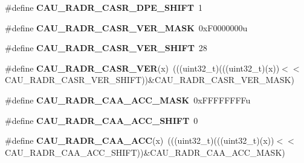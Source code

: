 \begin{DoxyCompactItemize}
\item 
\#define {\bfseries C\+A\+U\+\_\+\+R\+A\+D\+R\+\_\+\+C\+A\+S\+R\+\_\+\+D\+P\+E\+\_\+\+S\+H\+I\+FT}~1\hypertarget{group__CAU__Register__Masks_ga29f9fdde7f5d91e78a00e02dc66d90ce}{}\label{group__CAU__Register__Masks_ga29f9fdde7f5d91e78a00e02dc66d90ce}

\item 
\#define {\bfseries C\+A\+U\+\_\+\+R\+A\+D\+R\+\_\+\+C\+A\+S\+R\+\_\+\+V\+E\+R\+\_\+\+M\+A\+SK}~0x\+F0000000u\hypertarget{group__CAU__Register__Masks_ga93d73e487a9f7e0f78ff89b8c2162099}{}\label{group__CAU__Register__Masks_ga93d73e487a9f7e0f78ff89b8c2162099}

\item 
\#define {\bfseries C\+A\+U\+\_\+\+R\+A\+D\+R\+\_\+\+C\+A\+S\+R\+\_\+\+V\+E\+R\+\_\+\+S\+H\+I\+FT}~28\hypertarget{group__CAU__Register__Masks_ga9b9d89d85aab94d1cf9066dcdc9f80b3}{}\label{group__CAU__Register__Masks_ga9b9d89d85aab94d1cf9066dcdc9f80b3}

\item 
\#define {\bfseries C\+A\+U\+\_\+\+R\+A\+D\+R\+\_\+\+C\+A\+S\+R\+\_\+\+V\+ER}(x)~(((uint32\+\_\+t)(((uint32\+\_\+t)(x))$<$$<$C\+A\+U\+\_\+\+R\+A\+D\+R\+\_\+\+C\+A\+S\+R\+\_\+\+V\+E\+R\+\_\+\+S\+H\+I\+FT))\&C\+A\+U\+\_\+\+R\+A\+D\+R\+\_\+\+C\+A\+S\+R\+\_\+\+V\+E\+R\+\_\+\+M\+A\+SK)\hypertarget{group__CAU__Register__Masks_gad6072b4fc13d1b80be7ce33a71da8b1f}{}\label{group__CAU__Register__Masks_gad6072b4fc13d1b80be7ce33a71da8b1f}

\item 
\#define {\bfseries C\+A\+U\+\_\+\+R\+A\+D\+R\+\_\+\+C\+A\+A\+\_\+\+A\+C\+C\+\_\+\+M\+A\+SK}~0x\+F\+F\+F\+F\+F\+F\+F\+Fu\hypertarget{group__CAU__Register__Masks_ga547665f9f7c6125733272bdba9d975f3}{}\label{group__CAU__Register__Masks_ga547665f9f7c6125733272bdba9d975f3}

\item 
\#define {\bfseries C\+A\+U\+\_\+\+R\+A\+D\+R\+\_\+\+C\+A\+A\+\_\+\+A\+C\+C\+\_\+\+S\+H\+I\+FT}~0\hypertarget{group__CAU__Register__Masks_gac2c98d65b03f99b601c30efaec5044f8}{}\label{group__CAU__Register__Masks_gac2c98d65b03f99b601c30efaec5044f8}

\item 
\#define {\bfseries C\+A\+U\+\_\+\+R\+A\+D\+R\+\_\+\+C\+A\+A\+\_\+\+A\+CC}(x)~(((uint32\+\_\+t)(((uint32\+\_\+t)(x))$<$$<$C\+A\+U\+\_\+\+R\+A\+D\+R\+\_\+\+C\+A\+A\+\_\+\+A\+C\+C\+\_\+\+S\+H\+I\+FT))\&C\+A\+U\+\_\+\+R\+A\+D\+R\+\_\+\+C\+A\+A\+\_\+\+A\+C\+C\+\_\+\+M\+A\+SK)\hypertarget{group__CAU__Register__Masks_ga4b76d84deca84761050fb5501b2e1f90}{}\label{group__CAU__Register__Masks_ga4b76d84deca84761050fb5501b2e1f90}


\end{DoxyCompactItemize}
